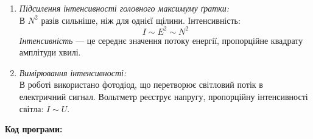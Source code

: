 \documentclass[12pt,a4paper]{article}
\begin{document}
\begin{enumerate}
  \item \textit{Підсилення інтенсивності головного максимуму ґратки:} \\
  В $N^2$ разів сильніше, ніж для однієї щілини. Інтенсивність:
  \[
    I \sim E^2 \sim N^2
  \]
  \textit{Інтенсивність} — це середнє значення потоку енергії, пропорційне квадрату амплітуди хвилі.

  \item \textit{Вимірювання інтенсивності:} \\
  В роботі використано фотодіод, що перетворює світловий потік в електричний сигнал. Вольтметр реєструє напругу, пропорційну інтенсивності світла: $I \sim U$.
\end{enumerate}

    \vspace{3em}

    \textbf{\large Код програми:}

    \vspace{1em}
\end{document}
